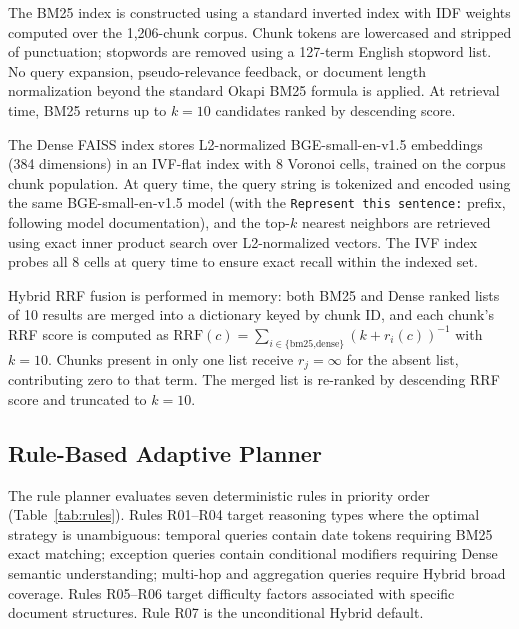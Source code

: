 \documentclass[11pt, a4paper]{article}
\begin{document}
The BM25 index is constructed using a standard inverted index with IDF weights computed over the 1,206-chunk corpus. Chunk tokens are lowercased and stripped of punctuation; stopwords are removed using a 127-term English stopword list. No query expansion, pseudo-relevance feedback, or document length normalization beyond the standard Okapi BM25 formula is applied. At retrieval time, BM25 returns up to $k{=}10$ candidates ranked by descending score.

The Dense FAISS index stores L2-normalized BGE-small-en-v1.5 embeddings (384 dimensions) in an IVF-flat index with 8 Voronoi cells, trained on the corpus chunk population. At query time, the query string is tokenized and encoded using the same BGE-small-en-v1.5 model (with the \texttt{Represent this sentence:} prefix, following model documentation), and the top-$k$ nearest neighbors are retrieved using exact inner product search over L2-normalized vectors. The IVF index probes all 8 cells at query time to ensure exact recall within the indexed set.

Hybrid RRF fusion is performed in memory: both BM25 and Dense ranked lists of 10 results are merged into a dictionary keyed by chunk ID, and each chunk's RRF score is computed as $\text{RRF}(c) = \sum_{i \in \{\text{bm25,dense}\}} (k + r_i(c))^{-1}$ with $k=10$. Chunks present in only one list receive $r_j = \infty$ for the absent list, contributing zero to that term. The merged list is re-ranked by descending RRF score and truncated to $k=10$.

\subsection{Rule-Based Adaptive Planner}

The rule planner evaluates seven deterministic rules in priority order (Table~\ref{tab:rules}). Rules R01--R04 target reasoning types where the optimal strategy is unambiguous: temporal queries contain date tokens requiring BM25 exact matching; exception queries contain conditional modifiers requiring Dense semantic understanding; multi-hop and aggregation queries require Hybrid broad coverage. Rules R05--R06 target difficulty factors associated with specific document structures. Rule R07 is the unconditional Hybrid default.
\end{document}
